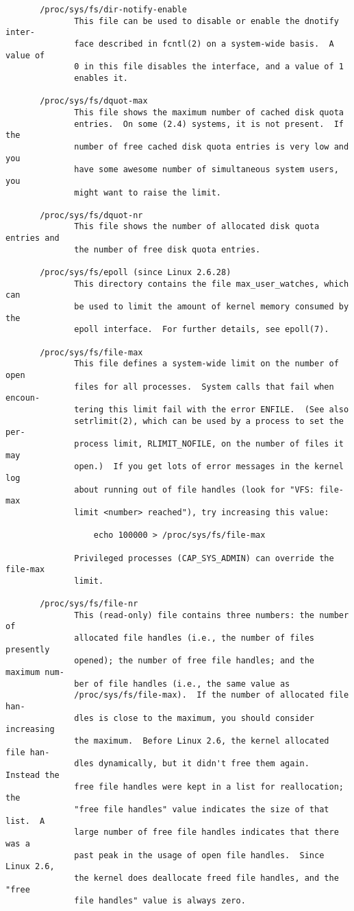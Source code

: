 \documentclass[]{article}
\begin{document}
\begin{verbatim}
       /proc/sys/fs/dir-notify-enable
              This file can be used to disable or enable the dnotify inter‐
              face described in fcntl(2) on a system-wide basis.  A value of
              0 in this file disables the interface, and a value of 1
              enables it.

       /proc/sys/fs/dquot-max
              This file shows the maximum number of cached disk quota
              entries.  On some (2.4) systems, it is not present.  If the
              number of free cached disk quota entries is very low and you
              have some awesome number of simultaneous system users, you
              might want to raise the limit.

       /proc/sys/fs/dquot-nr
              This file shows the number of allocated disk quota entries and
              the number of free disk quota entries.

       /proc/sys/fs/epoll (since Linux 2.6.28)
              This directory contains the file max_user_watches, which can
              be used to limit the amount of kernel memory consumed by the
              epoll interface.  For further details, see epoll(7).

       /proc/sys/fs/file-max
              This file defines a system-wide limit on the number of open
              files for all processes.  System calls that fail when encoun‐
              tering this limit fail with the error ENFILE.  (See also
              setrlimit(2), which can be used by a process to set the per-
              process limit, RLIMIT_NOFILE, on the number of files it may
              open.)  If you get lots of error messages in the kernel log
              about running out of file handles (look for "VFS: file-max
              limit <number> reached"), try increasing this value:

                  echo 100000 > /proc/sys/fs/file-max

              Privileged processes (CAP_SYS_ADMIN) can override the file-max
              limit.

       /proc/sys/fs/file-nr
              This (read-only) file contains three numbers: the number of
              allocated file handles (i.e., the number of files presently
              opened); the number of free file handles; and the maximum num‐
              ber of file handles (i.e., the same value as
              /proc/sys/fs/file-max).  If the number of allocated file han‐
              dles is close to the maximum, you should consider increasing
              the maximum.  Before Linux 2.6, the kernel allocated file han‐
              dles dynamically, but it didn't free them again.  Instead the
              free file handles were kept in a list for reallocation; the
              "free file handles" value indicates the size of that list.  A
              large number of free file handles indicates that there was a
              past peak in the usage of open file handles.  Since Linux 2.6,
              the kernel does deallocate freed file handles, and the "free
              file handles" value is always zero.


\end{verbatim}
\end{document}
